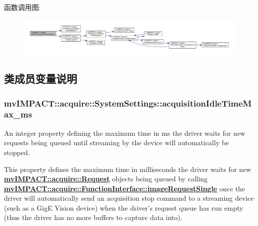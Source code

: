 函数调用图\+:
\nopagebreak
\begin{figure}[H]
\begin{center}
\leavevmode
\includegraphics[width=350pt]{classmv_i_m_p_a_c_t_1_1acquire_1_1_system_settings_aa494575f3d3beef84ba4789ecaf182ae_cgraph}
\end{center}
\end{figure}




\subsection{类成员变量说明}
\hypertarget{classmv_i_m_p_a_c_t_1_1acquire_1_1_system_settings_a2903927f7e84385d4fb1d4241a54084b}{
\subsubsection[{acquisition\+Idle\+Time\+Max\+\_\+ms}]{ mv\+I\+M\+P\+A\+C\+T\+::acquire\+::\+System\+Settings\+::acquisition\+Idle\+Time\+Max\+\_\+ms}}\label{classmv_i_m_p_a_c_t_1_1acquire_1_1_system_settings_a2903927f7e84385d4fb1d4241a54084b}


An integer property defining the maximum time in ms the driver waits for new requests being queued until streaming by the device will automatically be stopped. 

This property defines the maximum time in milliseconds the driver waits for new {\bfseries \hyperlink{classmv_i_m_p_a_c_t_1_1acquire_1_1_request}{mv\+I\+M\+P\+A\+C\+T\+::acquire\+::\+Request}} objects being queued by calling {\bfseries \hyperlink{classmv_i_m_p_a_c_t_1_1acquire_1_1_function_interface_a59571120b5e81c3af596ea5da5dc63ba}{mv\+I\+M\+P\+A\+C\+T\+::acquire\+::\+Function\+Interface\+::image\+Request\+Single}} once the driver will automatically send an acquisition stop command to a streaming device (such as a Gig\+E Vision device) when the driver's request queue has run empty (thus the driver has no more buffers to capture data into).

